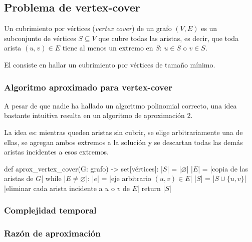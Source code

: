 \subsection{Problema de vertex-cover}

Un cubrimiento por vértices (\textit{vertex cover}) de un grafo $(V,E)$ es un subconjunto de vértices $S\subseteq V$ que cubre todas las aristas, es decir, que toda arista $(u,v) \in E$ tiene al menos un extremo en $S$: $u\in S$ o $v\in S$.

El  consiste en hallar un cubrimiento por vértices de tamaño mínimo.

\subsubsection{Algoritmo aproximado para vertex-cover}

A pesar de que nadie ha hallado un algoritmo polinomial correcto, una idea bastante intuitiva resulta en un algoritmo de aproximación 2.

La idea es: mientras queden aristas sin cubrir, se elige arbitrariamente una de ellas, se agregan ambos extremos a la solución y se descartan todas las demás aristas incidentes a esos extremos.

\begin{pseudocode}
def aprox_vertex_cover(G: grafo) -> set[vértices]:
    |$S$| = |$\varnothing$|
    |$E$| = |\textrm{copia de las aristas de }$G$| 
    while |$E \neq \varnothing$|:
        |$e$| = |\textrm{eje arbitrario }$(u, v) \in E$| 
        |$S$| = |$S \cup \{u, v\}$|
        |\textrm{eliminar cada arista incidente a }$u$\textrm{ o }$v$\textrm{ de }$E$|
    return |$S$|
\end{pseudocode}

\subsubsection{Complejidad temporal}



\subsubsection{Razón de aproximación}